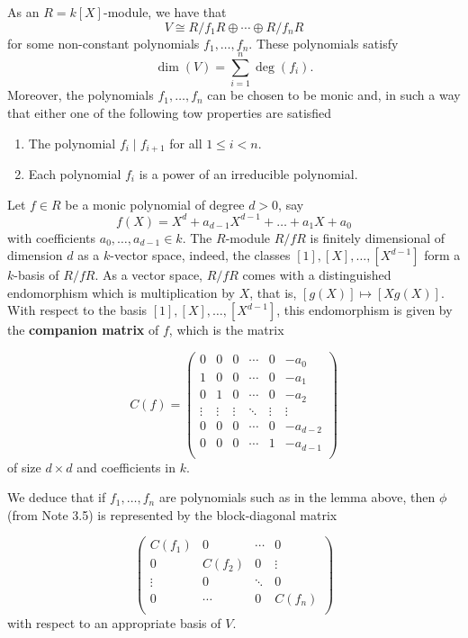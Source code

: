 \documentclass[12pt, a4paper]{article}
\begin{document}
\begin{mdlemma}
    As an \(R=k[X]\)-module, we have that 
    \[V \cong R/f_1R\oplus \cdots \oplus R/f_n R\]
    for some non-constant polynomials \(f_1,\ldots,f_n\). These polynomials satisfy 
    \[\dim(V) =\sum_{i=1}^n \deg(f_i).\]
    Moreover, the polynomials \(f_1,\ldots,f_n\) can be chosen to be monic and, in such a way that either one of the following tow properties are satisfied 
    \begin{enumerate}
        \item The polynomial \(f_i \mid f_{i+1}\) for all \(1\leq i <n\).
        \item Each polynomial \(f_i\) is a power of an irreducible polynomial.
    \end{enumerate}
\end{mdlemma}

\begin{definition}
     Let \( f \in R \) be a monic polynomial of degree \( d > 0 \), say
    \[
    f(X) = X^d + a_{d-1}X^{d-1} + \ldots + a_1X + a_0
    \]
    with coefficients \( a_0, \ldots, a_{d-1} \in k \). The \( R \)-module \( R/fR \) is finitely dimensional of dimension \( d \) as a \( k \)-vector space, indeed, the classes \( [1], [X], \ldots, [X^{d-1}] \) form a \( k \)-basis of \( R/fR \). As a vector space, \( R/fR \) comes with a distinguished endomorphism which is multiplication by \( X \), that is, \( [g(X)] \mapsto [Xg(X)] \). With respect to the basis \( [1], [X], \ldots, [X^{d-1}] \), this endomorphism is given by the \textbf{companion matrix} of \( f \), which is the matrix
    
    \[
    C(f) = 
    \begin{pmatrix}
    0 & 0 & 0 & \cdots & 0 & -a_0 \\
    1 & 0 & 0 & \cdots & 0 & -a_1 \\
    0 & 1 & 0 & \cdots & 0 & -a_2 \\
    \vdots & \vdots & \vdots & \ddots & \vdots & \vdots \\
    0 & 0 & 0 & \cdots & 0 & -a_{d-2} \\
    0 & 0 & 0 & \cdots & 1 & -a_{d-1} \\
    \end{pmatrix}
    \]
    of size \( d \times d \) and coefficients in \( k \). 
\end{definition}



\begin{corollary}
    We deduce that if \( f_1, \ldots, f_n \) are polynomials such as in the lemma above, then \( \phi \) (from Note 3.5) is represented by the block-diagonal matrix
    
    \[
    \begin{pmatrix}
    C(f_1) & 0 & \cdots & 0 \\
    0 & C(f_2) & 0 & \vdots \\
    \vdots & 0 & \ddots & 0 \\
    0 & \cdots & 0 & C(f_n) \\
    \end{pmatrix}
    \]
    with respect to an appropriate basis of \( V \).
\end{corollary}
\end{document}
